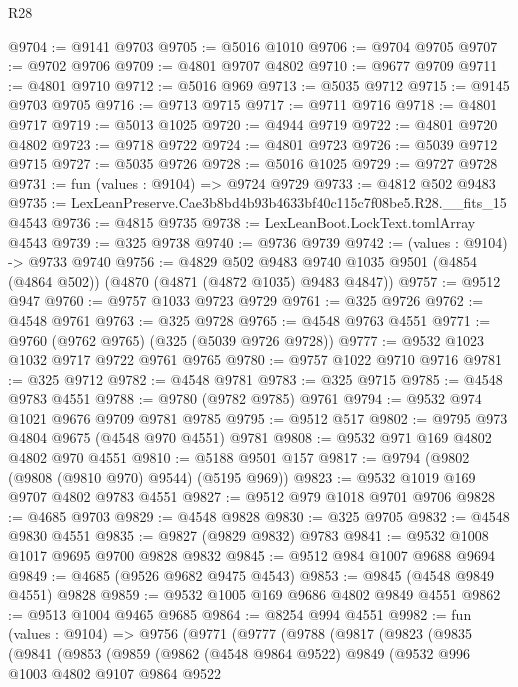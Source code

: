 \begin{lexlean}{R28}
\begin{coremodule}
@9704 := @9141 @9703
@9705 := @5016 @1010
@9706 := @9704 @9705
@9707 := @9702 @9706
@9709 := @4801 @9707 @4802
@9710 := @9677 @9709
@9711 := @4801 @9710
@9712 := @5016 @969
@9713 := @5035 @9712
@9715 := @9145 @9703 @9705
@9716 := @9713 @9715
@9717 := @9711 @9716
@9718 := @4801 @9717
@9719 := @5013 @1025
@9720 := @4944 @9719
@9722 := @4801 @9720 @4802
@9723 := @9718 @9722
@9724 := @4801 @9723
@9726 := @5039 @9712 @9715
@9727 := @5035 @9726
@9728 := @5016 @1025
@9729 := @9727 @9728
@9731 := fun (values : @9104) => @9724 @9729
@9733 := @4812 @502 @9483
@9735 := LexLeanPreserve.Cae3b8bd4b93b4633bf40c115c7f08be5.R28.__fits_15 @4543
@9736 := @4815 @9735
@9738 := LexLeanBoot.LockText.tomlArray @4543
@9739 := @325 @9738
@9740 := @9736 @9739
@9742 := (values : @9104) -> @9733 @9740
@9756 := @4829
    @502
    @9483
    @9740
    @1035
    @9501
    (@4854 (@4864 @502))
    (@4870 (@4871 (@4872 @1035) @9483 @4847))
@9757 := @9512 @947
@9760 := @9757 @1033 @9723 @9729
@9761 := @325 @9726
@9762 := @4548 @9761
@9763 := @325 @9728
@9765 := @4548 @9763 @4551
@9771 := @9760 (@9762 @9765) (@325 (@5039 @9726 @9728))
@9777 := @9532 @1023 @1032 @9717 @9722 @9761 @9765
@9780 := @9757 @1022 @9710 @9716
@9781 := @325 @9712
@9782 := @4548 @9781
@9783 := @325 @9715
@9785 := @4548 @9783 @4551
@9788 := @9780 (@9782 @9785) @9761
@9794 := @9532 @974 @1021 @9676 @9709 @9781 @9785
@9795 := @9512 @517
@9802 := @9795 @973 @4804 @9675 (@4548 @970 @4551) @9781
@9808 := @9532 @971 @169 @4802 @4802 @970 @4551
@9810 := @5188 @9501 @157
@9817 := @9794 (@9802 (@9808 (@9810 @970) @9544) (@5195 @969))
@9823 := @9532 @1019 @169 @9707 @4802 @9783 @4551
@9827 := @9512 @979 @1018 @9701 @9706
@9828 := @4685 @9703
@9829 := @4548 @9828
@9830 := @325 @9705
@9832 := @4548 @9830 @4551
@9835 := @9827 (@9829 @9832) @9783
@9841 := @9532 @1008 @1017 @9695 @9700 @9828 @9832
@9845 := @9512 @984 @1007 @9688 @9694
@9849 := @4685 (@9526 @9682 @9475 @4543)
@9853 := @9845 (@4548 @9849 @4551) @9828
@9859 := @9532 @1005 @169 @9686 @4802 @9849 @4551
@9862 := @9513 @1004 @9465 @9685
@9864 := @8254 @994 @4551
@9982 := fun (values : @9104) =>
  @9756
    (@9771
      (@9777
        (@9788
          (@9817
            (@9823
              (@9835
                (@9841
                  (@9853
                    (@9859
                      (@9862
                        (@4548 @9864 @9522)
                        @9849
                        (@9532
                          @996
                          @1003
                          @4802
                          @9107
                          @9864
                          @9522

\end{coremodule}
\end{lexlean}
